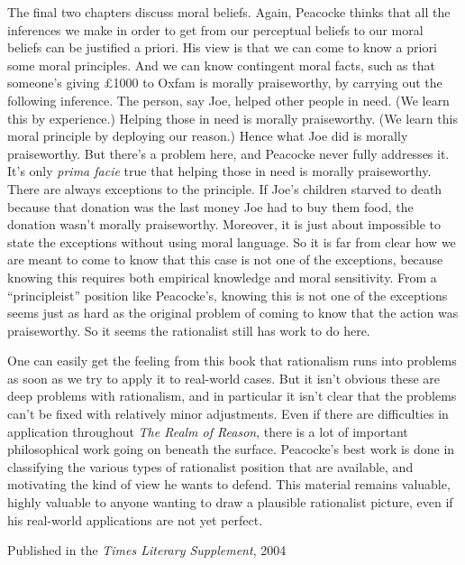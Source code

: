 \documentclass[
  10pt,
  letterpaper,
  DIV=11,
  numbers=noendperiod,
  twoside]{scrartcl}
\begin{document}
The final two chapters discuss moral beliefs. Again, Peacocke thinks
that all the inferences we make in order to get from our perceptual
beliefs to our moral beliefs can be justified a priori. His view is that
we can come to know a priori some moral principles. And we can know
contingent moral facts, such as that someone's giving £1000 to Oxfam is
morally praiseworthy, by carrying out the following inference. The
person, say Joe, helped other people in need. (We learn this by
experience.) Helping those in need is morally praiseworthy. (We learn
this moral principle by deploying our reason.) Hence what Joe did is
morally praiseworthy. But there's a problem here, and Peacocke never
fully addresses it. It's only \emph{prima facie} true that helping those
in need is morally praiseworthy. There are always exceptions to the
principle. If Joe's children starved to death because that donation was
the last money Joe had to buy them food, the donation wasn't morally
praiseworthy. Moreover, it is just about impossible to state the
exceptions without using moral language. So it is far from clear how we
are meant to come to know that this case is not one of the exceptions,
because knowing this requires both empirical knowledge and moral
sensitivity. From a ``principleist'' position like Peacocke's, knowing
this is not one of the exceptions seems just as hard as the original
problem of coming to know that the action was praiseworthy. So it seems
the rationalist still has work to do here.

One can easily get the feeling from this book that rationalism runs into
problems as soon as we try to apply it to real-world cases. But it isn't
obvious these are deep problems with rationalism, and in particular it
isn't clear that the problems can't be fixed with relatively minor
adjustments. Even if there are difficulties in application throughout
\emph{The Realm of Reason}, there is a lot of important philosophical
work going on beneath the surface. Peacocke's best work is done in
classifying the various types of rationalist position that are
available, and motivating the kind of view he wants to defend. This
material remains valuable, highly valuable to anyone wanting to draw a
plausible rationalist picture, even if his real-world applications are
not yet perfect.

\vspace{1cm}



Published in the \emph{Times Literary Supplement}, 2004 \\
\end{document}
